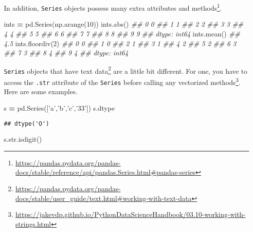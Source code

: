 \documentclass[12pt,krantz2]{krantz}
\makeatletter
\newenvironment{Shaded}{\begin{snugshade}}{\end{snugshade}}
\newcommand{\BuiltInTok}[1]{#1}
\newcommand{\CommentTok}[1]{\textcolor[rgb]{0.37,0.37,0.37}{\textit{#1}}}
\newcommand{\DecValTok}[1]{\textcolor[rgb]{0.06,0.06,0.06}{#1}}
\newcommand{\NormalTok}[1]{#1}
\newcommand{\OperatorTok}[1]{\textcolor[rgb]{0.43,0.43,0.43}{\textbf{#1}}}
\newcommand{\StringTok}[1]{\textcolor[rgb]{0.5,0.5,0.5}{#1}}
\renewcommand{\href}[2]{#2\footnote{\url{#1}}}
\newenvironment{kframe}{%
\medskip{}
\setlength{\fboxsep}{.8em}
 \def\at@end@of@kframe{}%
 \ifinner\ifhmode%
  \def\at@end@of@kframe{\end{minipage}}%
  \begin{minipage}{\columnwidth}%
 \fi\fi%
 \def\FrameCommand##1{\hskip\@totalleftmargin \hskip-\fboxsep
 \colorbox{shadecolor}{##1}\hskip-\fboxsep
     \hskip-\linewidth \hskip-\@totalleftmargin \hskip\columnwidth}%
 \MakeFramed {\advance\hsize-\width
   \@totalleftmargin\z@ \linewidth\hsize
   \@setminipage}}%
 {\par\unskip\endMakeFramed%
 \at@end@of@kframe}
\renewenvironment{Shaded}{\begin{kframe}}{\end{kframe}}
\makeatother
\begin{document}
In addition, \texttt{Series} objects possess many extra \href{https://pandas.pydata.org/pandas-docs/stable/reference/api/pandas.Series.html\#pandas-series}{attributes and methods}.

\begin{Shaded}
\begin{Highlighting}[]
\NormalTok{ints }\OperatorTok{=}\NormalTok{ pd.Series(np.arange(}\DecValTok{10}\NormalTok{))}
\NormalTok{ints.}\BuiltInTok{abs}\NormalTok{()}
\CommentTok{## 0    0}
\CommentTok{## 1    1}
\CommentTok{## 2    2}
\CommentTok{## 3    3}
\CommentTok{## 4    4}
\CommentTok{## 5    5}
\CommentTok{## 6    6}
\CommentTok{## 7    7}
\CommentTok{## 8    8}
\CommentTok{## 9    9}
\CommentTok{## dtype: int64}
\NormalTok{ints.mean()}
\CommentTok{## 4.5}
\NormalTok{ints.floordiv(}\DecValTok{2}\NormalTok{)}
\CommentTok{## 0    0}
\CommentTok{## 1    0}
\CommentTok{## 2    1}
\CommentTok{## 3    1}
\CommentTok{## 4    2}
\CommentTok{## 5    2}
\CommentTok{## 6    3}
\CommentTok{## 7    3}
\CommentTok{## 8    4}
\CommentTok{## 9    4}
\CommentTok{## dtype: int64}
\end{Highlighting}
\end{Shaded}

\texttt{Series} objects that have \href{https://pandas.pydata.org/pandas-docs/stable/user_guide/text.html\#working-with-text-data}{text data} are a little bit different. For one, you have to access the \texttt{.str} attribute of the \texttt{Series} before calling any \href{https://jakevdp.github.io/PythonDataScienceHandbook/03.10-working-with-strings.html}{vectorized methods}. Here are some examples.

\begin{Shaded}
\begin{Highlighting}[]
\NormalTok{s }\OperatorTok{=}\NormalTok{ pd.Series([}\StringTok{'a'}\NormalTok{,}\StringTok{'b'}\NormalTok{,}\StringTok{'c'}\NormalTok{,}\StringTok{'33'}\NormalTok{])}
\NormalTok{s.dtype}
\end{Highlighting}
\end{Shaded}

\begin{verbatim}
## dtype('O')
\end{verbatim}

\begin{Shaded}
\begin{Highlighting}[]
\NormalTok{s.}\BuiltInTok{str}\NormalTok{.isdigit()}
\end{Highlighting}
\end{Shaded}
\end{document}
